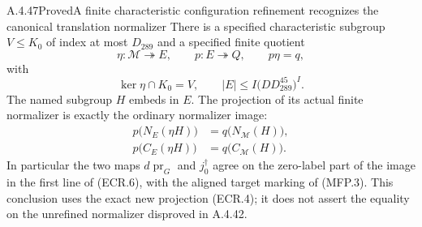 \begin{result}{A.4.47}{Proved}{A finite characteristic configuration refinement recognizes the canonical translation normalizer}
There is a specified characteristic subgroup $V\leq K_0$ of index at
most $D_{289}$ and a specified finite quotient
\[
 \eta:\mathcal M\twoheadrightarrow E,\qquad
 p:E\twoheadrightarrow Q,\qquad p\eta=q,
                                                               \tag{ECR.4}
\]
with
\[
 \ker\eta\cap K_0=V,\qquad
 |E|\leq I\bigl(D D_{289}^{45}\bigr)^I.
                                                               \tag{ECR.5}
\]
The named subgroup $H$ embeds in $E$.  The projection of its actual
finite normalizer is exactly the ordinary normalizer image:
\[
 \begin{split}
 p\bigl(N_E(\eta H)\bigr)&=q\bigl(N_{\mathcal M}(H)\bigr),\\
 p\bigl(C_E(\eta H)\bigr)&=q\bigl(C_{\mathcal M}(H)\bigr).
 \end{split}                                                    \tag{ECR.6}
\]
In particular the two maps $d\operatorname{pr}_G$ and $j_0^\dagger$
agree on the zero-label part of the image in the first line of
(ECR.6), with the aligned target marking of (MFP.3).
This conclusion uses the exact new projection (ECR.4); it does not
assert the equality on the unrefined normalizer disproved in A.4.42.
\end{result}

